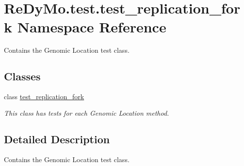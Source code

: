 \hypertarget{namespaceReDyMo_1_1test_1_1test__replication__fork}{}\section{Re\+Dy\+Mo.\+test.\+test\+\_\+replication\+\_\+fork Namespace Reference}
\label{namespaceReDyMo_1_1test_1_1test__replication__fork}


Contains the Genomic Location test class.  


\subsection*{Classes}
\begin{DoxyCompactItemize}
\item 
class \mbox{\hyperlink{classReDyMo_1_1test_1_1test__replication__fork_1_1test__replication__fork}{test\+\_\+replication\+\_\+fork}}
\begin{DoxyCompactList}\small\item\em This class has tests for each Genomic Location method. \end{DoxyCompactList}\end{DoxyCompactItemize}


\subsection{Detailed Description}
Contains the Genomic Location test class. 